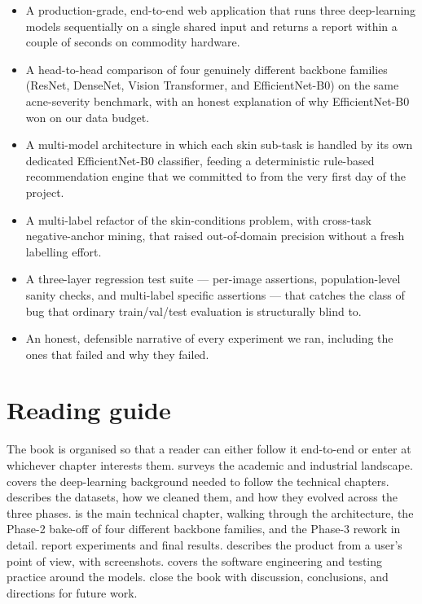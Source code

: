 \documentclass[11pt,a4paper,oneside]{report}
\newcommand{\effnet}{EfficientNet-B0\xspace}
\begin{document}
\begin{itemize}
    \item A production-grade, end-to-end web application that runs
        three deep-learning models sequentially on a single shared
        input and returns a report within a couple of seconds on
        commodity hardware.
    \item A head-to-head comparison of four genuinely different
        backbone families (ResNet, DenseNet, Vision Transformer, and
        \effnet) on the same acne-severity benchmark, with an honest
        explanation of why \effnet won on our data budget.
    \item A multi-model architecture in which each skin sub-task is
        handled by its own dedicated \effnet classifier, feeding a
        deterministic rule-based recommendation engine that we
        committed to from the very first day of the project.
    \item A multi-label refactor of the skin-conditions problem, with
        cross-task negative-anchor mining, that raised out-of-domain
        precision without a fresh labelling effort.
    \item A three-layer regression test suite --- per-image assertions,
        population-level sanity checks, and multi-label specific
        assertions --- that catches the class of bug that ordinary
        train/val/test evaluation is structurally blind to.
    \item An honest, defensible narrative of every experiment we ran,
        including the ones that failed and why they failed.
\end{itemize}

\section{Reading guide}

The book is organised so that a reader can either follow it end-to-end
or enter at whichever chapter interests them.
 surveys the academic and industrial landscape.
 covers the deep-learning background needed to follow
the technical chapters.
 describes the datasets, how we cleaned them, and how
they evolved across the three phases.
 is the main technical chapter, walking through
the architecture, the Phase-2 bake-off of four different backbone
families, and the Phase-3 rework in detail.
 report experiments and final results.
 describes the product from a user's point of view,
with screenshots.
 covers the software engineering and testing
practice around the models.
 close the book with
discussion, conclusions, and directions for future work.
\end{document}
